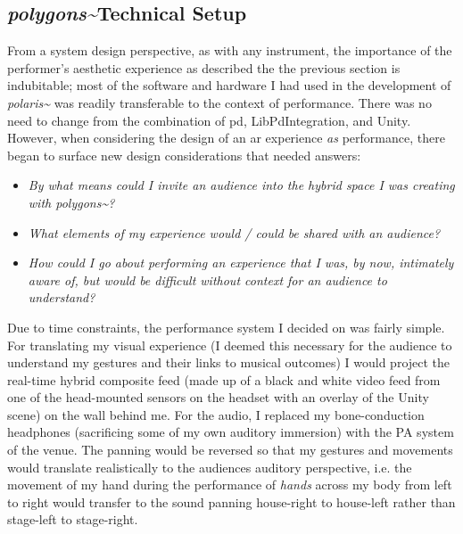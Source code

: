 \subsection{\textit{polygons\textasciitilde{}}Technical Setup}\label{sec: polygons-performances-setup}
From a system design perspective, as with any instrument, the importance of the performer's aesthetic experience as described the the previous section is indubitable; most of the software and hardware I had used in the development of \textit{polaris\textasciitilde{}} was readily transferable to the context of performance. There was no need to change from the combination of \gls{pd}, LibPdIntegration, and Unity. However, when considering the design of an \gls{ar} experience \textit{as} performance, there began to surface new design considerations that needed answers:
\begin{itemize}
    \item \textit{By what means could I invite an audience into the hybrid space I was creating with \textit{polygons\textasciitilde{}}?} 
    \item \textit{What elements of my experience would / could be shared with an audience?} 
    \item \textit{How could I go about performing an experience that I was, by now, intimately aware of, but would be difficult without context for an audience to understand?} 
\end{itemize}
Due to time constraints, the performance system I decided on was fairly simple. For translating my visual experience (I deemed this necessary for the audience to understand my gestures and their links to musical outcomes) I would project the real-time hybrid composite feed (made up of a black and white video feed from one of the head-mounted sensors on the headset with an overlay of the Unity scene) on the wall behind me. For the audio, I replaced my bone-conduction headphones (sacrificing some of my own auditory immersion) with the PA system of the venue. The panning would be reversed so that my gestures and movements would translate realistically to the audiences auditory perspective, i.e. the movement of my hand during the performance of \textit{hands} across my body from left to right would transfer to the sound panning house-right to house-left rather than stage-left to stage-right.

